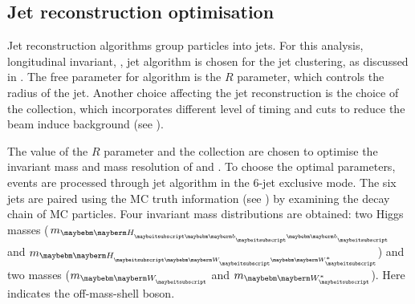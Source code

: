 \subsection{Jet reconstruction optimisation}
\label{sec:doubleHiggsJetOptimisation}

Jet reconstruction algorithms group particles into jets. For this analysis, longitudinal invariant, \kt, jet algorithm is chosen for the jet clustering, as discussed in . The free parameter for \kt algorithm is the $R$ parameter, which controls the radius of the jet. Another choice affecting the jet reconstruction is the choice of the \PFO collection, which incorporates different level of timing and \pT cuts to reduce the beam induce background (see ).

The value of the $R$ parameter and the \PFO collection are chosen to optimise the invariant mass and mass resolution of \PHiggs and \PW. To choose the optimal parameters, \eeToHHbbWWHad events  are processed through \kt jet algorithm  in the 6-jet exclusive mode. The six jets are paired using the MC truth information (see ) by examining the decay chain of MC particles. Four invariant mass distributions are obtained: two Higgs masses ($m_{\Hbb}$ and $m_{\HWW}$) and two \PW masses ($m_{\PW}$ and $m_{\W*}$). Here \W* indicates the off-mass-shell \PW boson.





